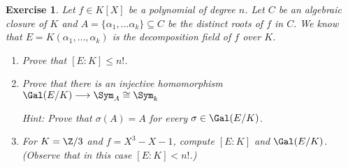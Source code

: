 \documentclass[a4paper,10pt,reqno]{amsart}
\newtheorem{ex}{Exercise}[section]
\begin{document}
\begin{ex}
\label{5.2}
    Let $f\in K[X]$ be a polynomial of degree $n$.
    Let $C$ be an algebraic closure of $K$ and $A=\{\alpha_1,\dots\alpha_k\}\subseteq C$ be the distinct roots of $f$ in $C.$
    We know that $E=K(\alpha_1,\dots,\alpha_k)$ is the decomposition field of $f$ over $K$.
    \begin{enumerate}[label=(\roman*)]
    \item Prove that $[E:K]\leq n! $.
    \item Prove that there is an injective homomorphism $\Gal(E/K)\longrightarrow \Sym_{A}\cong \Sym_k$ 
    
    \noindent\textit{Hint: } Prove that $\sigma(A)=A$ for every $\sigma \in \Gal(E/K)$.
    \item For $K=\Z/3$ and $f=X^3-X-1$, compute $[E:K]$ and $\Gal(E/K)$.
    (Observe that in this case $[E:K]<n!$.)
    \end{enumerate}
\end{ex}
\end{document}
